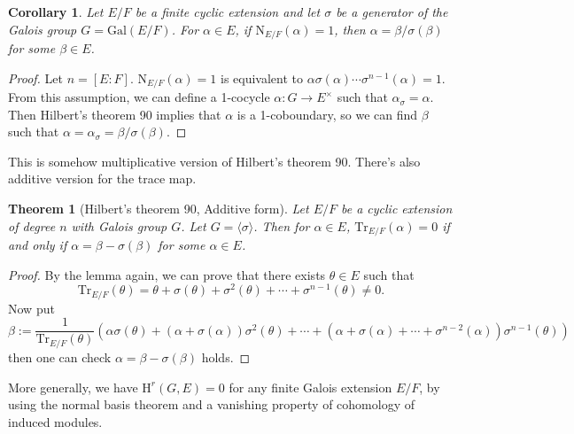 \documentclass{article}
\newtheorem{theorem}{Theorem}
\newcommand{\Gal}{\mathrm{Gal}}
\newcommand{\Tr}{\mathrm{Tr}}
\newcommand{\Nm}{\mathrm{N}}
\newtheorem{corollary}{Corollary}
\newcommand{\rH}{\mathrm{H}}
\begin{document}
\begin{corollary}
Let $E/F$ be a finite cyclic extension and let $\sigma$ be a generator of the Galois group $G = \Gal(E/F)$. For $\alpha\in E$, if $\Nm_{E/F}(\alpha) = 1$, then $\alpha = \beta/\sigma(\beta)$ for some $\beta\in E$. 
\end{corollary}
\begin{proof}
Let $n = [E:F]$. $\Nm_{E/F} (\alpha) = 1$ is equivalent to $\alpha \sigma(\alpha)\cdots \sigma^{n-1}(\alpha) = 1$. From this assumption, we can define a 1-cocycle $\alpha:G\to E^{\times}$ such that $\alpha_{\sigma} = \alpha$. Then Hilbert's theorem 90 implies that $\alpha$ is a 1-coboundary, so we can find $\beta$ such that $\alpha = \alpha_{\sigma} = \beta / \sigma(\beta)$. 
\end{proof}
This is somehow multiplicative version of Hilbert's theorem 90. There's also additive version for the trace map. 
\begin{theorem}[Hilbert's theorem 90, Additive form]
Let $E/F$ be a cyclic extension of degree $n$ with Galois group $G$. Let $G = \langle \sigma\rangle$. Then for $\alpha\in E$, $\Tr_{E/F}(\alpha) = 0$ if and only if $\alpha = \beta -\sigma(\beta)$ for some $\alpha\in E$. 
\end{theorem}
\begin{proof}
By the lemma again, we can prove that there exists $\theta\in E$ such that
$$
\Tr_{E/F}(\theta) = \theta + \sigma(\theta) + \sigma^{2}(\theta) + \cdots + \sigma^{n-1}(\theta) \neq 0. 
$$
Now put
$$
\beta := \frac{1}{\Tr_{E/F}(\theta)} (\alpha \sigma(\theta) + (\alpha+\sigma(\alpha))\sigma^{2}(\theta) + \cdots + (\alpha+\sigma(\alpha) + \cdots +\sigma^{n-2}(\alpha))\sigma^{n-1}(\theta))
$$
then one can check $\alpha = \beta - \sigma(\beta)$ holds. 
\end{proof}
More generally, we have $\rH^{r}(G, E) = 0$ for any finite Galois extension $E/F$, by using the normal basis theorem and a vanishing property of cohomology of  induced modules. 
\end{document}
